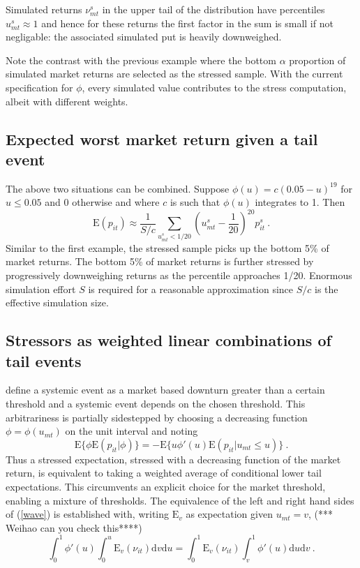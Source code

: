 \documentclass[authoryear]{elsarticle}
\newcommand{\E}{\mathrm{E}}
\newcommand{\de}{\mathrm{d}}
\newcommand{\eref}[1]{(\ref{#1})}
\newcommand{\be}[1]{\begin{equation}\label{#1}}
\newcommand{\ee}{\end{equation}}
\begin{document}
Simulated returns $\nu^s_{mt}$ in the upper tail of the distribution  have percentiles $u^s_{mt}\approx 1$ and hence for these returns the first factor in the sum is  small if not negligable: the associated simulated put  is heavily downweighed.

Note the contrast with the previous example where the bottom $\alpha$ proportion of simulated market returns are selected as the stressed sample. With the current specification for $\phi$,   every simulated value contributes to the stress computation, albeit with  different weights.


\subsection{Expected worst market return given a tail event}

The above two situations can be combined.   Suppose  $\phi(u)=c(0.05-u)^{19}$ for $u\le 0.05$ and 0 otherwise and where $c$ is such that $\phi(u)$ integrates to 1.  Then
$$
\E(p_{it}) \approx \frac{1}{S/c}\sum_{u^s_{mt}<1/20}  \left(u^s_{mt}-\frac{1}{20}\right)^{20}p_{it}^s\ .
$$
 Similar to the first example, the stressed sample picks up the bottom 5\% of market returns. The bottom 5\% of market returns is further stressed by  progressively downweighing returns as the percentile approaches 1/20.   Enormous simulation effort $S$ is required for a reasonable approximation since $S/c$ is the effective simulation size.
 
 \subsection{Stressors as  weighted linear combinations of tail events}

\cite{brownlees2015} define a systemic event as a market based downturn greater than a certain threshold and a systemic event  depends on the chosen threshold.   This arbitrariness is partially sidestepped by choosing a decreasing function $\phi=\phi(u_{mt})$ on the unit interval and noting 
\be{wave}
\E\{\phi\E(p_{it}|\phi)\} = -\E\{u\phi'(u)\E(p_{it}|u_{mt}\le u)\}\ .
\ee
Thus a stressed expectation, stressed with a decreasing function of the market return, is equivalent to taking a weighted average of conditional lower tail expectations.  This circumvents an explicit choice for the market threshold, enabling a mixture of thresholds.  The equivalence of the left and right hand sides of \eref{wave}  is established with, writing $\E_v$ as expectation given $u_{mt}=v$,  (*** Weihao can you check this****)
$$
\int_0^1 \phi'(u)  \int_0^u \E_v(\nu_{it})\de v   \de u =\int_0^1\E_v(\nu_{it})\int_v^1  \phi'(u) \de u \de v\ .   
$$
\end{document}
